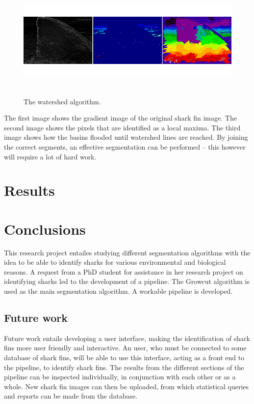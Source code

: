 \documentclass[a4paper,10pt]{article}
\begin{document}
\begin{figure}[H]
\centering
\includegraphics[width=5in,height=2in]{watershed.png} 
\label{fig3}
\caption{The watershed algorithm\cite{scikit}.}
\end{figure}

\noindent The first image shows the gradient image of the original shark fin
image.  The second image shows the pixels that are identified as a local maxima.
 The third image shows how the basins flooded until watershed lines are reached.
 By joining the correct segments, an effective segmentation can be performed -- this however will require
 a lot of hard work.

\newpage
\section{Results}
\subsection{}


\subsection{}


\newpage
\section{Conclusions}
This research project entailes studying different segmentation algorithms with the idea to be able to identify sharks for various environmental and biological reasons.
A request from a PhD student for assistance in her research project on identifying sharks led to the development of a pipeline. The Growcut algorithm is used as the main segmentation algorithm. A workable pipeline is developed. \\

\subsection{Future work}
Future work entails developing a user
interface, making the identification of shark fins more user friendly and interactive.
An user, who must be connected to some database of shark fins, will be able to
use this interface, acting as a front end to the
  pipeline, to identify shark fins.  The
results from the different sections of the pipeline can be
  inspected individually, in
conjunction with each other or as a whole.  New shark fin images can then be
uploaded, from which statistical queries and reports can be
made from the database. \\
\end{document}
